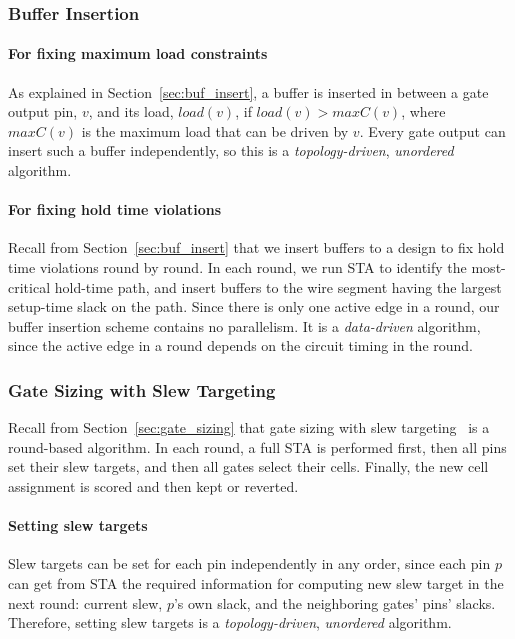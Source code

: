 \subsubsection{Buffer Insertion}

\paragraph{For fixing maximum load constraints} As explained in Section~\ref{sec:buf_insert}, a buffer is inserted in between a gate output pin, $v$, and its load, $load(v)$, if $load(v) > maxC(v)$, where $maxC(v)$ is the maximum load that can be driven by $v$.
Every gate output can insert such a buffer independently, so this is a {\em topology-driven}, {\em unordered} algorithm.

\paragraph{For fixing hold time violations} Recall from Section~\ref{sec:buf_insert} that we insert buffers to a design to fix hold time violations round by round. In each round, we run STA to identify the most-critical hold-time path, and insert buffers to the wire segment having the largest setup-time slack on the path. Since there is only one active edge in a round, our buffer insertion scheme contains no parallelism. It is a {\em data-driven} algorithm, since the active edge in a round depends on the circuit timing in the round.

\subsubsection{Gate Sizing with Slew Targeting}

Recall from Section~\ref{sec:gate_sizing} that gate sizing with slew targeting~\cite{Held:Gate} is a round-based algorithm. In each round, a full STA is performed first, then all pins set their slew targets, and then all gates select their cells. Finally, the new cell assignment is scored and then kept or reverted.

\paragraph{Setting slew targets} Slew targets can be set for each pin independently in any order, since each pin $p$ can get from STA the required information for computing new slew target in the next round: current slew, $p$'s own slack, and the neighboring gates' pins' slacks. Therefore, setting slew targets is a {\em topology-driven}, {\em unordered} algorithm.

